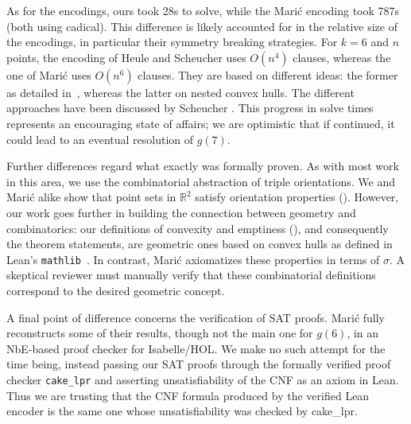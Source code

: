 As for the encodings,
ours took 28s to solve,
while the Marić encoding took 787s (both using \textsf{cadical}).
This difference is likely accounted for in the relative size of the encodings,
in particular their symmetry breaking strategies.
For $k=6$ and $n$ points,
the encoding of Heule and Scheucher uses $O(n^4)$ clauses,
whereas the one of Marić uses $O(n^6)$ clauses.
They are based on different ideas:
the former as detailed in~,
whereas the latter on nested convex hulls.
The different approaches have been discussed by Scheucher \cite{scheucherTwoDisjoint5holes2020}.
This progress in solve times
represents an encouraging state of affairs;
we are optimistic that if continued,
it could lead to an eventual resolution of $g(7)$.

Further differences regard what exactly was formally proven.
As with most work in this area,
we use the combinatorial abstraction of triple orientations.
We and Marić alike show that point sets in $\mathbb R^2$
satisfy orientation properties ().
However, our work goes further in building the connection
between geometry and combinatorics:
our definitions of convexity and emptiness (),
and consequently the theorem statements,
are geometric ones based on convex hulls
as defined in Lean's \texttt{mathlib}~\cite{The_mathlib_Community_2020}.
In contrast, Marić axiomatizes these properties in terms of $\sigma$.
A skeptical reviewer must manually verify that these combinatorial definitions
correspond to the desired geometric concept.

A final point of difference concerns the verification of SAT proofs.
Marić fully reconstructs some of their results,
though not the main one for $g(6)$,
in an NbE-based proof checker for Isabelle/HOL.
We make no such attempt for the time being,
instead passing our SAT proofs through the
formally verified proof checker \texttt{cake\_lpr} \cite{tanVerifiedPropagationRedundancy2023}
and asserting unsatisfiability of the CNF as an axiom in Lean.
Thus we are trusting that the CNF formula produced by the verified Lean encoder
is the same one whose unsatisfiability was checked by \textsf{cake\_lpr}.
